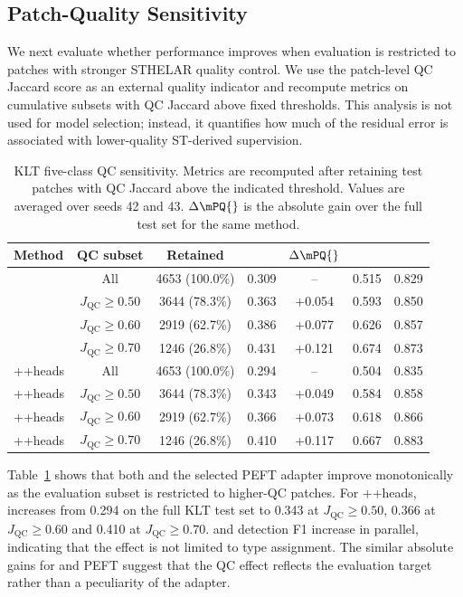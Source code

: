 \subsection{Patch-Quality Sensitivity}

We next evaluate whether performance improves when evaluation is restricted to
patches with stronger STHELAR quality control. We use the patch-level QC
Jaccard score as an external quality indicator and recompute metrics on
cumulative subsets with QC Jaccard above fixed thresholds. This analysis is not
used for model selection; instead, it quantifies how much of the residual error
is associated with lower-quality ST-derived supervision.

\begin{table}
\caption{KLT five-class QC sensitivity. Metrics are recomputed after retaining
test patches with QC Jaccard above the indicated threshold. Values are averaged
over seeds 42 and 43. \(\Delta\mPQ{}\) is the absolute gain over the full test
set for the same method.}
\label{tab:klt-qc}
\centering
{\fontsize{8}{9}\selectfont
\begin{tabular}{lcccccc}
\toprule
Method & QC subset & Retained & \mPQ{} & \(\Delta\mPQ{}\) & \bPQ{} & \Fdet{} \\
\midrule
\FullFT{} & All & 4653 (100.0\%) & 0.309 & -- & 0.515 & 0.829 \\
\FullFT{} & \(J_{\mathrm{QC}}\ge0.50\) & 3644 (78.3\%) & 0.363 & +0.054 & 0.593 & 0.850 \\
\FullFT{} & \(J_{\mathrm{QC}}\ge0.60\) & 2919 (62.7\%) & 0.386 & +0.077 & 0.626 & 0.857 \\
\FullFT{} & \(J_{\mathrm{QC}}\ge0.70\) & 1246 (26.8\%) & 0.431 & +0.121 & 0.674 & 0.873 \\
\midrule
\LoRA{}+\AF{}+heads & All & 4653 (100.0\%) & 0.294 & -- & 0.504 & 0.835 \\
\LoRA{}+\AF{}+heads & \(J_{\mathrm{QC}}\ge0.50\) & 3644 (78.3\%) & 0.343 & +0.049 & 0.584 & 0.858 \\
\LoRA{}+\AF{}+heads & \(J_{\mathrm{QC}}\ge0.60\) & 2919 (62.7\%) & 0.366 & +0.073 & 0.618 & 0.866 \\
\LoRA{}+\AF{}+heads & \(J_{\mathrm{QC}}\ge0.70\) & 1246 (26.8\%) & 0.410 & +0.117 & 0.667 & 0.883 \\
\bottomrule
\end{tabular}
}
\end{table}

Table~\ref{tab:klt-qc} shows that both \FullFT{} and the selected PEFT adapter
improve monotonically as the evaluation subset is restricted to higher-QC
patches. For \LoRA{}+\AF{}+heads, \mPQ{} increases from 0.294 on the full KLT
test set to 0.343 at \(J_{\mathrm{QC}}\ge0.50\), 0.366 at
\(J_{\mathrm{QC}}\ge0.60\) and 0.410 at \(J_{\mathrm{QC}}\ge0.70\).
\bPQ{} and detection F1 increase in parallel,
indicating that the effect is not limited to type assignment. The similar
absolute gains for \FullFT{} and PEFT suggest that the QC effect reflects the
evaluation target rather than a peculiarity of the adapter.


